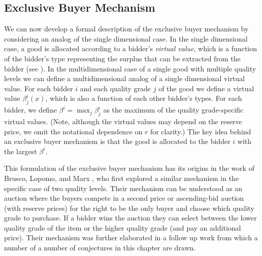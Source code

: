 \subsection{Exclusive Buyer Mechanism}\label{subsec_exclusive buyer mechanism}

We can now develop a formal description of the exclusive buyer mechanism by considering an analog of the single dimensional case. In the single dimensional case, a good is allocated according to a bidder's \textit{virtual value}, which is a function of the bidder's type representing the surplus that can be extracted from the bidder (see \cite{myerson1981optimal}). In the multidimensional case of a single good with multiple quality levels we can define a multidimensional analog of a single dimensional virtual value. For each bidder $i$ and each quality grade $j$ of the good we define a virtual value $\beta_j^i(x)$, which is also a function of each other bidder's types. For each bidder, we define $\beta^i = \max_j \beta_j^i$ as the maximum of the quality grade-specific virtual values. (Note, although the virtual values may depend on the reserve price, we omit the notational dependence on $r$ for clarity.) The key idea behind an exclusive buyer mechanism is that the good is allocated to the bidder $i$ with the largest $\beta^i$.

This formulation of the exclusive buyer mechanism has its origins in the work of Brusco, Lopomo, and Marx \autocite*{brusco2011}, who first explored a similar mechanism in the specific case of two quality levels. Their mechanism can be understood as an auction where the buyers compete in a second price or ascending-bid auction (with reserve prices) for the right to be the only buyer and choose which quality grade to purchase. If a bidder wins the auction they can select between the lower quality grade of the item or the higher quality grade (and pay an additional price). Their mechanism was further elaborated in a follow up work \autocite{belloni2010multidimensional} from which a number of a number of conjectures in this chapter are drawn. 

